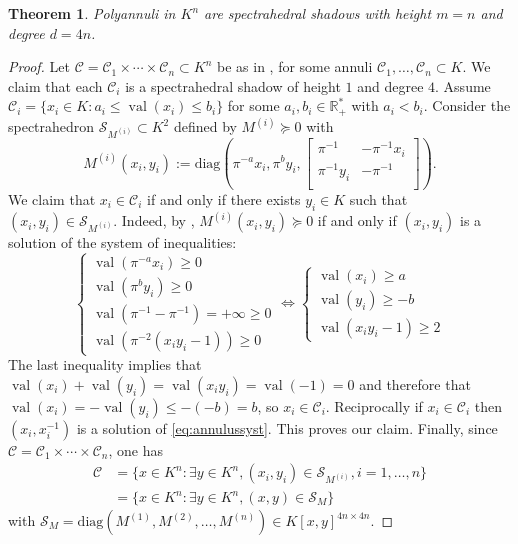 \documentclass[sigconf]{acmart}
\newcommand{\R}{\mathbb{R}} %
\newtheorem{theorem}{Theorem}[section]
\DeclareMathOperator{\val}{val}
\def\diag{\mathrm{diag}}
\begin{document}
\begin{theorem}
Polyannuli in $K^n$ are spectrahedral shadows with height $m=n$ and degree $d=4n$.
\end{theorem}
\begin{proof}
  Let $\mathcal{C} = \mathcal{C}_1 \times \cdots \times \mathcal{C}_n \subset K^n$ be as in ,
  for some annuli $\mathcal{C}_1,\ldots,\mathcal{C}_n \subset K$. We claim that each $\mathcal{C}_i$ is a spectrahedral
  shadow of height $1$ and degree $4$. Assume $\mathcal{C}_i = \{x_i \in K : a_i \leq \val(x_i) \leq b_i\}$
  for some $a_i, b_i \in \R^*_+$ with $a_i < b_i$. Consider the spectrahedron
  $\mathcal{S}_{M^{(i)}} \subset K^2$ defined by $M^{(i)} \succeq 0$ with
  $$
  M^{(i)}(x_i,y_i) := \diag\left(\pi^{-a} x_i, \pi^{b} y_i,
  \begin{bmatrix}
    \pi^{-1} & -\pi^{-1} x_i  \\
    \pi^{-1} y_i & - \pi^{-1} \\
  \end{bmatrix}\right).
  $$
  We claim that $x_i \in \mathcal{C}_i$ if and only if there exists $y_i \in K$ such that $(x_i,y_i) \in
  \mathcal{S}_{M^{(i)}}$.
  Indeed, by , $M^{(i)}(x_i,y_i) \succeq 0$ if and only if $(x_i,y_i)$ is a solution of the system
  of inequalities:
  \begin{equation}
    \label{eq:annulussyst}
    \begin{cases}
      \val(\pi^{-a} x_i) \ge 0 \\
  \val(\pi^{b} y_i) \ge 0\\
  \val(\pi^{-1}- \pi^{-1}) = +\infty \ge 0\\
  \val(\pi^{-2}\left( x_iy_i-1 \right))  \ge 0 
\end{cases}
\iff	
\begin{cases} 
  \val\left(x_i\right)\ge a\\
  \val\left(y_i\right)\ge -b\\
  \val\left(x_iy_i-1 \right) \ge 2
\end{cases}
\end{equation} 
  The last inequality implies that $\val\left(x_i\right)+\val\left(y_i\right)=\val\left(x_iy_i\right) = \val\left(-1\right) =0$ and therefore that $\val\left(x_i\right)=-\val\left(y_i\right)\le -(-b) = b$, so $x_i \in \mathcal{C}_i$. 
Reciprocally if $x_i \in \mathcal{C}_i$ then $(x_i,x_i^{-1})$ is a solution of \eqref{eq:annulussyst}.
This proves our claim.
Finally, since $\mathcal{C} = \mathcal{C}_1 \times \cdots \times \mathcal{C}_n$, one has
\begin{equation*}
  \begin{aligned}
    \mathcal{C} &=
    \{x \in K^n : \exists y  \in K^n, (x_i,y_i) \in
    \mathcal{S}_{M^{(i)}}, i=1,\ldots,n\} \\
    &= \{x \in K^n : \exists y \in K^n, (x,y) \in \mathcal{S}_M\}
  \end{aligned}
\end{equation*}
with $\mathcal{S}_M = \diag(M^{(1)}, M^{(2)}, \ldots, M^{(n)}) \in K[x,y]^{4n \times 4n}.$
\end{proof}
\end{document}
